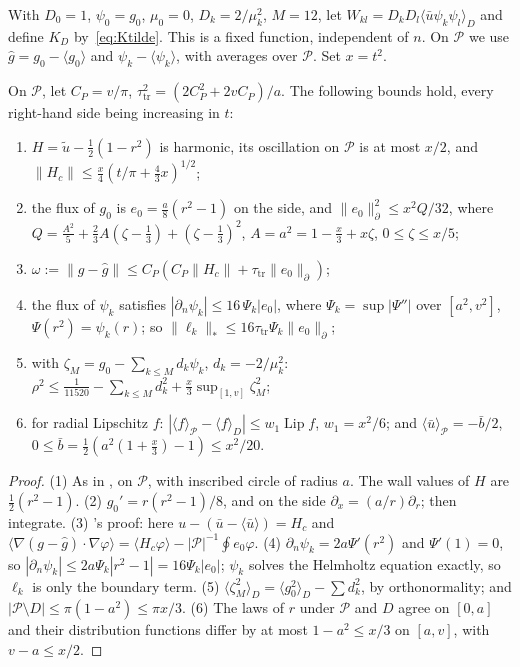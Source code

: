 \documentclass[11pt,a4paper]{report}
\DeclareRobustCommand*{\avg}[1]{\langle #1\rangle}
\DeclareRobustCommand*{\norm}[1]{\lVert #1\rVert}
\DeclareRobustCommand*{\bdnorm}[1]{\lVert #1\rVert_{\partial}}
\DeclareRobustCommand*{\dualnorm}[1]{\lVert #1\rVert_{*}}
\DeclareRobustCommand*{\ut}{\tilde u}
\begin{document}
With \(D_0=1\), \(\psi_0=g_0\), \(\mu_0=0\), \(D_k=2/\mu_k^2\), \(M=12\), let \(W_{kl}=D_kD_l\avg{\bar u\psi_k\psi_l}_D\) and define \(K_D\) by~\eqref{eq:Ktilde}. This is a
fixed function, independent of \(n\). On \(\mathcal P\) we use \(\hat g=g_0-\avg{g_0}\) and \(\psi_k-\avg{\psi_k}\), with averages over \(\mathcal P\). Set \(x=t^2\).

\begin{lemma}\label{lem:largeerrors}
On \(\mathcal P\), let \(C_P=v/\pi\), \(\tau_{\mathrm{tr}}^2=(2C_P^2+2vC_P)/a\). The following bounds hold, every right-hand side being increasing in \(t\):
\begin{enumerate}
\item \(H=\ut-\frac12(1-r^2)\) is harmonic, its oscillation on \(\mathcal P\) is at most \(x/2\), and \(\norm{H_c}\le\frac x4(t/\pi+\frac43x)^{1/2}\);
\item the flux of \(g_0\) is \(e_0=\frac a8(r^2-1)\) on the side, and \(\bdnorm{e_0}^2\le x^2Q/32\), where \(Q=\frac{A^2}5+\frac23A(\zeta-\frac13)+(\zeta-\frac13)^2\), \(A=a^2=1-\frac x3+x\zeta\),
\(0\le\zeta\le x/5\);
\item \(\omega:=\norm{g-\hat g}\le C_P(C_P\norm{H_c}+\tau_{\mathrm{tr}}\bdnorm{e_0})\);
\item the flux of \(\psi_k\) satisfies \(|\partial_n\psi_k|\le16\,\Psi_k|e_0|\), where \(\Psi_k=\sup|\Psi''|\) over \([a^2,v^2]\), \(\Psi(r^2)=\psi_k(r)\); so \(\dualnorm{\ell_k}\le16\tau_{\mathrm{tr}}\Psi_k\bdnorm{e_0}\);
\item with \(\zeta_M=g_0-\sum_{k\le M}d_k\psi_k\), \(d_k=-2/\mu_k^2\): \(\rho^2\le\frac1{11520}-\sum_{k\le M}d_k^2+\frac x3\sup_{[1,v]}\zeta_M^2\);
\item for radial Lipschitz \(f\): \(|\avg f_{\mathcal P}-\avg f_D|\le w_1\operatorname{Lip}f\), \(w_1=x^2/6\); and \(\avg{\bar u}_{\mathcal P}=-\bar b/2\), \(0\le\bar b=\frac12(a^2(1+\frac x3)-1)\le x^2/20\).
\end{enumerate}
\end{lemma}
\begin{proof}
(1) As in , on \(\mathcal P\), with inscribed circle of radius \(a\). The wall values of \(H\) are \(\frac12(r^2-1)\). (2) \(g_0'=r(r^2-1)/8\), and on the
side \(\partial_x=(a/r)\partial_r\); then integrate. (3) 's proof: here \(u-(\bar u-\avg{\bar u})=H_c\) and \(\avg{\nabla(g-\hat g)\cdot\nabla\varphi}=\avg{H_c\varphi}-|\mathcal P|^{-1}\oint e_0\varphi\).
(4) \(\partial_n\psi_k=2a\Psi'(r^2)\) and \(\Psi'(1)=0\), so \(|\partial_n\psi_k|\le2a\Psi_k|r^2-1|=16\Psi_k|e_0|\); \(\psi_k\) solves the Helmholtz equation exactly, so \(\ell_k\) is only the boundary term.
(5) \(\avg{\zeta_M^2}_D=\avg{g_0^2}_D-\sum d_k^2\), by orthonormality; and \(|\mathcal P\setminus D|\le\pi(1-a^2)\le\pi x/3\). (6) The laws of \(r\) under \(\mathcal P\) and \(D\) agree on
\([0,a]\) and their distribution functions differ by at most \(1-a^2\le x/3\) on \([a,v]\), with \(v-a\le x/2\).
\end{proof}
\end{document}
